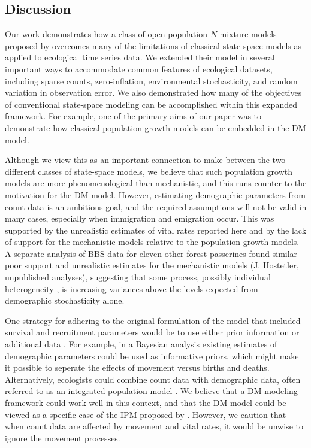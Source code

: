 \documentclass[12pt,english]{article}
\begin{document}
\begin{spacing}{1.9}
\begin{flushleft}
\section*{Discussion}

Our work demonstrates how a class of open population $N$-mixture models
proposed by \citet{dail_madsen:2011} overcomes 
many of the limitations of classical state-space models as applied to
ecological time series data.
We extended their model in several important
ways to accommodate common features of ecological
datasets, including sparse counts, zero-inflation, environmental
stochasticity, and random variation in observation error.
We also demonstrated how many of the objectives of conventional
state-space modeling can be accomplished within this expanded
framework. For example, one of the primary aims of our paper was to demonstrate how classical
population growth models can be embedded in the DM model.

Although we view this as an important connection to make between the two
different classes of state-space models, we believe that
such population growth models are more phenomenological
than mechanistic, and this runs counter to the motivation for
the DM model. However, estimating
demographic parameters from count data is an ambitious goal, and
the required assumptions will not be valid in many cases,
especially when immigration and emigration occur. This was supported by the
unrealistic estimates of vital rates reported here and by the
lack of support for the mechanistic models relative to the population
growth models.  A separate analysis of BBS data for eleven other forest passerines
found similar poor support and unrealistic estimates for the mechanistic 
models (J. Hostetler, unpublished analyses), suggesting that some process, possibly
individual heterogeneity \citep{vindenes_etal:2008}, is increasing variances
above the levels expected from demographic stochasticity alone.

One strategy for adhering to the original formulation of the
model that included survival and recruitment parameters would be to
use either prior information or additional data \citep{zipkin_etal:2014}. For example, in a 
Bayesian analysis existing estimates of demographic parameters
could be used as informative priors, which might make it possible to
seperate the effects of movement versus births and deaths.
Alternatively, ecologists could combine count data with demographic data,
often referred to as an integrated population model
\citep[IPM;][]{besbeas_etal:2002,schaub_etal:2007,chandler_clark:2014}.
We believe that a DM modeling framework could work well in this context,
and that the DM model could be viewed as a specific case of the
IPM proposed by \citet{buckland_etal:2004}.
However, we caution that when count data are affected by
movement and vital rates, it would be unwise to ignore the movement
processes.


\end{flushleft}
\end{spacing}
\end{document}
